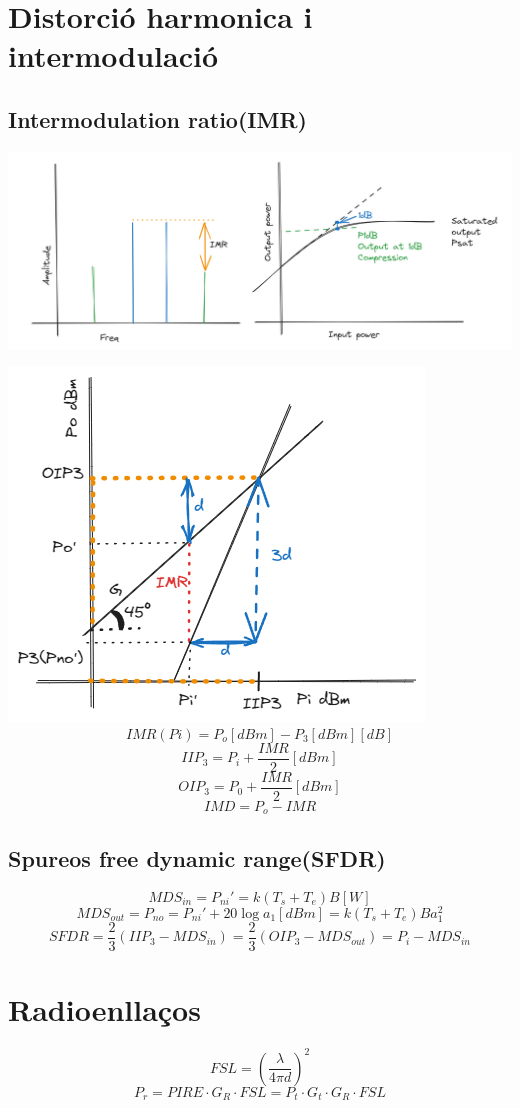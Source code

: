 \documentclass[a4paper,11pt]{article}
\begin{document}
\begin{multicols*}{2}
	\section{Distorció harmonica i intermodulació}
	\subsection{Intermodulation ratio(IMR)}
	\includegraphics[width=1\linewidth]{IMRcompresion.png}
	
	\includegraphics[width=1\linewidth]{OIPIIP3.png}
	$$IMR(Pi)=P_o[dBm]-P_3[dBm] [dB]$$
	$$IIP_3=P_i+\frac{IMR}{2} [dBm]$$
	$$OIP_3=P_0+\frac{IMR}{2} [dBm]$$
	$$IMD=P_o-IMR$$
	\subsection{Spureos free dynamic range(SFDR)}
	$$MDS_{in}=P_{ni}'=k(T_s+T_e)B [W]$$
	$$MDS_{out}=P_{no}=P_{ni}'+20\log a_1 [dBm]=k(T_s+T_e)Ba_1^2$$
	$$SFDR=\frac{2}{3}(IIP_3-MDS_{in})=\frac{2}{3}(OIP_3-MDS_{out})=P_i-MDS_{in} $$
	\section{Radioenllaços}
	$$FSL=(\frac{\lambda}{4\pi d})^2$$
	$$P_r=PIRE\cdot G_R\cdot FSL=P_t\cdot G_t\cdot G_R\cdot FSL$$
\end{multicols*}
\end{document}
